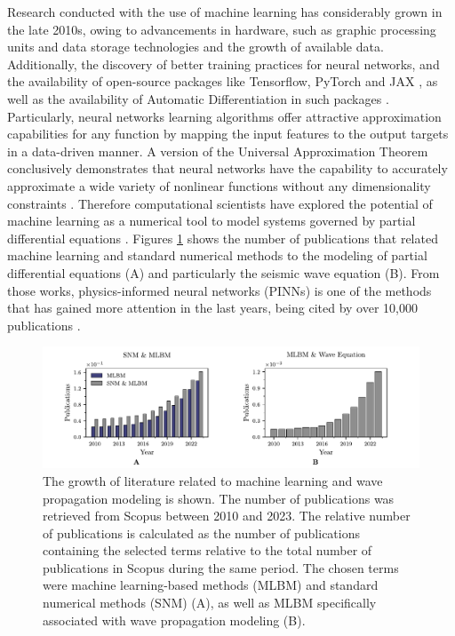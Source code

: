 \documentclass[11pt,twoside]{article}
\begin{document}
Research conducted with the use of machine learning has considerably grown in the late 2010s, owing to advancements 
in hardware, such as graphic processing units and data storage technologies and the growth of available data. 
Additionally, the discovery of better training practices for neural networks, and the availability of open-source 
packages like Tensorflow, PyTorch and JAX \citep{abadi_tensorflow_2016,paszke_pytorch_2019,jax2018github}, as well 
as the availability of Automatic Differentiation in such packages \citep{paszke_automatic_2017,baydin_automatic_2017}. 
Particularly, neural networks learning algorithms offer attractive approximation capabilities for any function by 
mapping the input features to the output targets in a data-driven manner. A version of the Universal Approximation 
Theorem conclusively demonstrates that neural networks have the capability to accurately approximate a wide 
variety of nonlinear functions without any dimensionality constraints \citep{barron_universal_1993}. Therefore 
computational scientists have explored the potential of machine learning as a numerical tool to model systems governed 
by partial differential equations \citep{cuomo_scientific_2022,karniadakis_physics-informed_2021}. Figures 
\ref{fig:publications_absolute_relative} shows the number of publications that related machine 
learning and standard numerical methods to the modeling of partial differential equations (A) and particularly
the seismic wave equation (B). From those works, physics-informed neural networks (PINNs) is one of the methods that 
has gained more attention in the last years, being cited by over 10,000 publications \citep{Raissi2019}.

\begin{figure}[H]
\centering
    \includegraphics[width=1.0\textwidth]{figs/publications_year.pdf}
    \caption{The growth of literature related to machine learning and wave propagation modeling is shown. 
    The number of publications was retrieved from Scopus between 2010 and 2023. The relative number of publications 
    is calculated as the number of publications containing the selected terms relative to the total number of 
    publications in Scopus during the same period. The chosen terms were machine learning-based methods (MLBM) 
    and standard numerical methods (SNM) (A), as well as MLBM specifically associated with wave propagation 
    modeling (B).} 
    \label{fig:publications_absolute_relative}
\end{figure}
\end{document}

